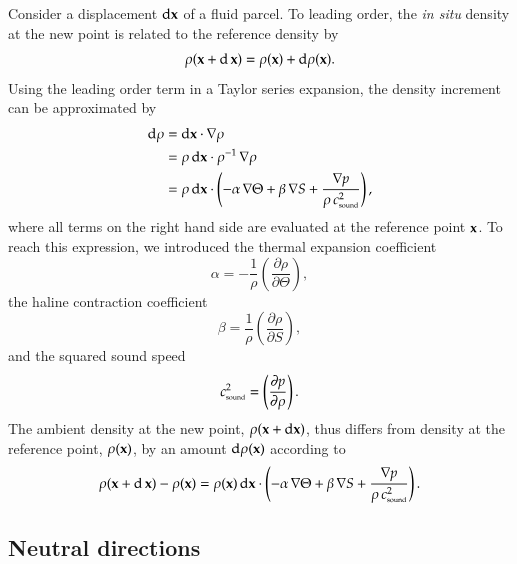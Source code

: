 Consider a displacement $\mathrm{d}{\bf x}$ of a fluid parcel.  To
leading order, the {\it in situ} density at the new point is related
to the reference density by
\begin{equation}
 \rho({\bf x} + \mathrm{d} \, {\bf x})= \rho({\bf x}) + \mathrm{d}\rho({\bf x}).
\end{equation}
Using the leading order term in a Taylor series expansion, the density
increment can be approximated by
\begin{equation}
\begin{split}
\mathrm{d}\rho &=  \mathrm{d}{\bf x} \cdot \nabla \rho
 \\
 &= \rho \, \mathrm{d}{\bf x} \cdot \rho^{-1} \, \nabla \rho
\\
&= 
\rho \, \mathrm{d}{\bf x} \cdot 
 \left( -\alpha \, \nabla \Theta + \beta \, \nabla  S  + \frac{\nabla p}{\rho \, c_{\mbox{\tiny sound}}^{2}  } \right),
\end{split}
\label{eq:full-density-increment-displacement}
\end{equation}
where all terms on the right hand side are evaluated at the reference
point ${\bf x}$.  To reach this expression, we introduced the thermal
expansion coefficient
\begin{equation}
 \alpha = -\frac{1}{\rho}\left( \frac{\partial \rho}{\partial \Theta} \right),
\label{eq:alpha-elements}
\end{equation}
the haline contraction coefficient 
\begin{equation}
 \beta = \frac{1}{\rho}\left( \frac{\partial \rho}{\partial S} \right),
\label{eq:beta-elements}
\end{equation}
and the squared sound speed
\begin{equation}
 c^{2}_{\mbox{\tiny sound}} = \left( \frac{\partial p}{\partial \rho}\right).
\label{eq:sound-speed-elements}
\end{equation}
The ambient density at the new point, $\rho({\bf x} + \mathrm{d} {\bf
  x})$, thus differs from density at the reference point, $\rho({\bf
  x})$, by an amount $\mathrm{d}\rho({\bf x})$ according to
\begin{equation}
 \rho({\bf x} + \mathrm{d} \, {\bf x}) - \rho({\bf x}) = 
 \rho({\bf x}) \, \mathrm{d}{\bf x} \cdot 
 \left( -\alpha \, \nabla \Theta + \beta \, \nabla  S  + \frac{ \nabla p }{\rho \, c_{\mbox{\tiny sound}}^{2}  }\right).
\end{equation}


\subsection{Neutral directions}
\label{subsection:neutral-directions}

